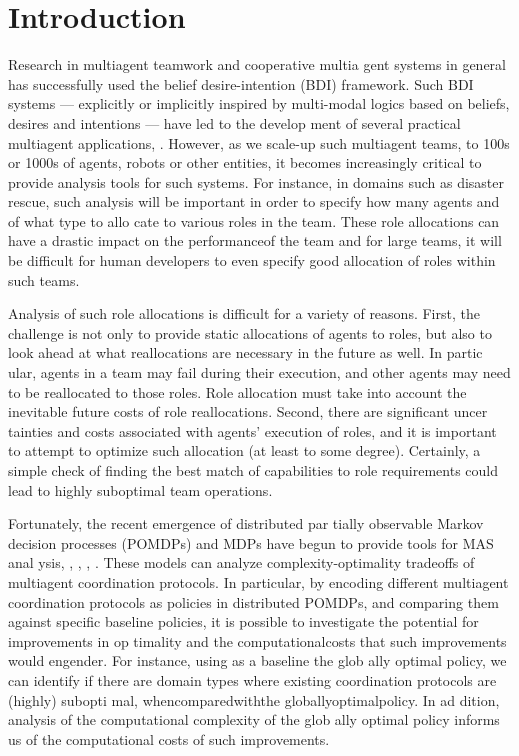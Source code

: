 \documentclass{IEEEtran}
\begin{document}
\section{\bfseries{Introduction}}

Research in multiagent teamwork and cooperative multia
gent systems in general has successfully used the belief
desire-intention (BDI) framework. Such BDI systems —
 explicitly or implicitly inspired by multi-modal logics based
 on beliefs, desires and intentions — have led to the develop
ment of several practical multiagent applications\cite{Decker},
\cite{Kitano}. However, as we scale-up
 such multiagent teams, to 100s or 1000s of agents, robots
 or other entities, it becomes increasingly critical to provide
 analysis tools for such systems. For instance, in domains
 such as disaster rescue, such analysis will be important in
 order to specify how many agents and of what type to allo
cate to various roles in the team. These role allocations can
 have a drastic impact on the performanceof the team and for 
 large teams, it will be difficult for human developers to even
 specify good allocation of roles within such teams.

 Analysis of such role allocations is difficult for a variety
 of reasons. First, the challenge is not only to provide static
 allocations of agents to roles, but also to look ahead at what
 reallocations are necessary in the future as well. In partic
ular, agents in a team may fail during their execution, and
 other agents may need to be reallocated to those roles. Role
 allocation must take into account the inevitable future costs
 of role reallocations. Second, there are significant uncer
tainties and costs associated with agents' execution of roles,
 and it is important to attempt to optimize such allocation (at
 least to some degree). Certainly, a simple check of finding
 the best match of capabilities to role requirements\cite{tidhar1996guided} could lead to highly suboptimal
 team operations.

 Fortunately, the recent emergence of distributed par
tially observable Markov decision processes (POMDPs)
 and MDPs have begun to provide tools for MAS anal
ysis\cite{Bernstein}, \cite{Boutilier}, \cite{Peshkin}, \cite{Pynadath}, \cite{Xuan}. These models can analyze
 complexity-optimality tradeoffs of multiagent coordination
 protocols. In particular, by encoding different multiagent
 coordination protocols as policies in distributed POMDPs,
 and comparing them against specific baseline policies, it is
 possible to investigate the potential for improvements in op
timality and the computationalcosts that such improvements
 would engender. For instance, using as a baseline the glob
ally optimal policy, we can identify if there are domain types
 where existing coordination protocols are (highly) subopti
mal, whencomparedwiththe globallyoptimalpolicy. In ad
dition, analysis of the computational complexity of the glob
ally optimal policy informs us of the computational costs of
 such improvements.
\end{document}

